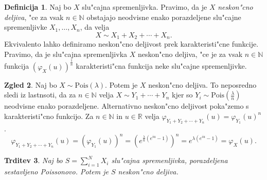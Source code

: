 \documentclass[12pt, a4paper, reqno]{amsart}
\theoremstyle{definition}
\newtheorem{definicija}{Definicija}[section]
\newtheorem{zgled}[definicija]{Zgled}
\theoremstyle{plain}
\newtheorem{trditev}[definicija]{Trditev}
\newcommand{\R}{\mathbb{R}}
\newcommand{\N}{\mathbb{N}}
\newcommand{\1}{\mathds{1}}
\newcommand{\Pois}[1]{\text{Pois}(#1)}
\begin{document}
    \begin{definicija}
        Naj bo $X$ slu"cajna spremenljivka. Pravimo, da je $X$ \textit{neskon"cno deljiva}, "ce za vsak $n\in\N$
        obstajajo neodvisne enako porazdeljene slu"cajne spremenljivke $X_1, \dots, X_n$, da velja
        \begin{equation*}
            X \sim X_1 + X_2 + \cdots + X_n.
        \end{equation*}
        Ekvivalento lahko definiramo neskon"cno deljivost prek karakteristi"cne funkcije. Pravimo, da je
        slu"cajna spremenljivka $X$ neskon"cno deljiva, "ce je za vsak $n\in\N$ funkcija 
        $\left(\varphi_X(u)\right)^{\frac{1}{n}}$ karakteristi"cna funkcija neke slu"cajne spremenljivke.
    \end{definicija}

    \begin{zgled}
        Naj bo $X\sim \text{Pois}(\lambda)$. Potem je $X$ neskon"cno deljiva. To neposredno sledi 
        iz lastnsoti, da za $n\in\N$ velja $X\sim Y_1 + \cdots + Y_n$ kjer so $Y_i\sim\Pois{\frac{\lambda}{n}}$ neodvisne 
        enako porazdeljene. Alternativno neskon"cno deljivost poka"zemo s karakteristi"cno
        funkcijo. Za $n\in\N$ in $u\in\R$ velja $\varphi_{Y_1 + Y_2 + \cdots + Y_n}(u) = \varphi_{Y_1}(u)^n$. 
        \begin{equation*}
        \varphi_{Y_1 + Y_2 + \cdots + Y_n}(u) = 
        \left(\varphi_{Y_1}(u)\right)^n = \left(e^{\tfrac{\lambda}{n}(e^{iu} - 1)}\right)^n = e^{\lambda(e^{iu} - 1)} = \varphi_X(u).
        \end{equation*}
    \end{zgled}

    \begin{trditev}
        Naj bo $S = \sum_{i=1}^NX_i$ slu"cajna spremenljivka, porazdeljena sestavljeno Poissonovo.
        Potem je $S$ neskon"cno deljiva.
        \label{trd:CPDneskoncnoDeljiva}
    \end{trditev}
\end{document}
